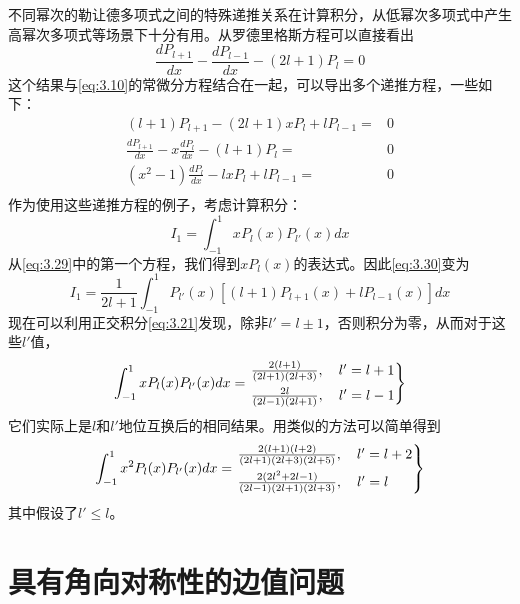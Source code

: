 \documentclass[12pt]{book}
\numberwithin{equation}{chapter}
\numberwithin{figure}{chapter}
\numberwithin{footnote}{page}
\begin{document}
不同幂次的勒让德多项式之间的特殊递推关系在计算积分，从低幂次多项式中产生高幂次多项式等场景下十分有用。从罗德里格斯方程可以直接看出
\begin{equation}\label{eq:3.28}
    \frac{dP_{l+1}}{dx}-\frac{dP_{l-1}}{dx}-(2l+1)P_l=0
\end{equation}
这个结果与\autoref{eq:3.10}的常微分方程结合在一起，可以导出多个递推方程，一些如下：
\begin{equation}\label{eq:3.29}
    \begin{aligned}
        (l+1)P_{l+1}-(2l+1)xP_l+lP_{l-1}=&0\\
        \frac{dP_{l+1}}{dx}-x\frac{dP_l}{dx}-(l+1)P_l=&0\\
        (x^2-1)\frac{dP_l}{dx}-lxP_l+lP_{l-1}=&0\\
    \end{aligned}
\end{equation}
作为使用这些递推方程的例子，考虑计算积分：
\begin{equation}\label{eq:3.30}
    I_1=\int_{-1}^1 xP_l(x)P_{l'}(x)dx
\end{equation}
从\autoref{eq:3.29}中的第一个方程，我们得到$xP_l(x)$的表达式。因此\autoref{eq:3.30}变为
$$I_1=\frac{1}{2l+1}\int_{-1}^1 P_{l'}(x)[(l+1)P_{l+1}(x)+lP_{l-1}(x)]dx$$
现在可以利用正交积分\autoref{eq:3.21}发现，除非$l'=l\pm 1$，否则积分为零，从而对于这些$l'$值，
\begin{equation}\label{eq:3.31}
    \int_{-1}^1 xP_l(x)P_{l'}(x)dx=
    \begin{rcases*}
        \frac{2(l+1)}{(2l+1)(2l+3)},\quad l'=l+1\\
        \frac{2l}{(2l-1)(2l+1)},\quad l'=l-1\\
    \end{rcases*}
\end{equation}
它们实际上是$l$和$l'$地位互换后的相同结果。用类似的方法可以简单得到
\begin{equation}\label{3.32}
    \int_{-1}^1 x^2P_l(x)P_{l'}(x)dx=
    \begin{rcases*}
        \frac{2(l+1)(l+2)}{(2l+1)(2l+3)(2l+5)},\quad l'=l+2\\
        \frac{2(2l^2+2l-1)}{(2l-1)(2l+1)(2l+3)},\quad l'=l\\
    \end{rcases*}
\end{equation}
其中假设了$l'\leq l$。

\section{具有角向对称性的边值问题}\label{sec:3.3}
\end{document}
